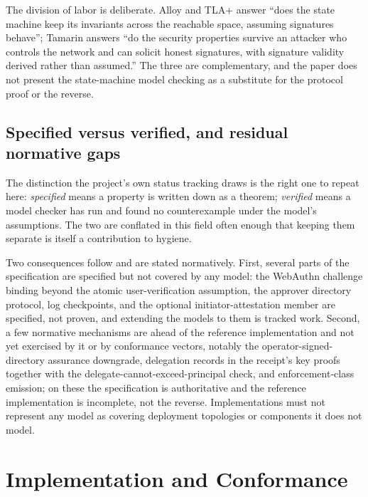 \documentclass[11pt]{article}
\begin{document}
The division of labor is deliberate. Alloy and TLA+ answer ``does the state machine
keep its invariants across the reachable space, assuming signatures behave'';
Tamarin answers ``do the security properties survive an attacker who controls the
network and can solicit honest signatures, with signature validity derived rather
than assumed.'' The three are complementary, and the paper does not present the
state-machine model checking as a substitute for the protocol proof or the reverse.

\subsection{Specified versus verified, and residual normative gaps}

The distinction the project's own status tracking draws is the right one to repeat
here: \emph{specified} means a property is written down as a theorem;
\emph{verified} means a model checker has run and found no counterexample under the
model's assumptions. The two are conflated in this field often enough that keeping
them separate is itself a contribution to hygiene.

Two consequences follow and are stated normatively. First, several parts of the
specification are specified but not covered by any model: the WebAuthn challenge
binding beyond the atomic user-verification assumption, the approver directory
protocol, log checkpoints, and the optional initiator-attestation member are
specified, not proven, and extending the models to them is tracked work. Second, a
few normative mechanisms are ahead of the reference implementation and not yet
exercised by it or by conformance vectors, notably the operator-signed-directory
assurance downgrade, delegation records in the receipt's key proofs together with
the delegate-cannot-exceed-principal check, and enforcement-class emission; on these
the specification is authoritative and the reference implementation is incomplete,
not the reverse. Implementations must not represent any model as covering
deployment topologies or components it does not model.

\section{Implementation and Conformance}
\end{document}
